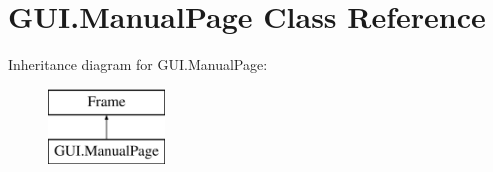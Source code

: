 \hypertarget{class_g_u_i_1_1_manual_page}{}\section{G\+U\+I.\+Manual\+Page Class Reference}
\label{class_g_u_i_1_1_manual_page}
Inheritance diagram for G\+U\+I.\+Manual\+Page\+:\begin{figure}[H]
\begin{center}
\leavevmode
\includegraphics[height=2.000000cm]{class_g_u_i_1_1_manual_page}
\end{center}
\end{figure}
